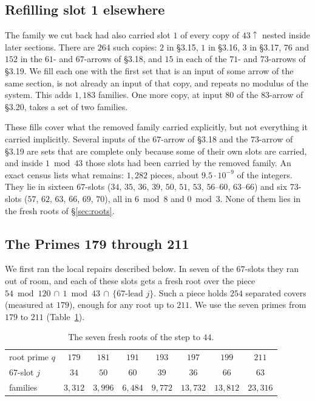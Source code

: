 \documentclass[11pt]{amsart}
\theoremstyle{definition}
\theoremstyle{remark}
\newcommand{\up}{{\uparrow}}
\begin{document}
\subsection*{Refilling slot 1 elsewhere}
The family we cut back had also carried slot $1$ of every copy of $43\up$ nested inside later sections. There are
$264$ such copies: $2$ in §3.15, $1$ in §3.16, $3$ in §3.17, $76$ and $152$ in the $61$- and $67$-arrows of §3.18,
and $15$ in each of the $71$- and $73$-arrows of §3.19. We fill each one with the first set that is an input of some
arrow of the same section, is not already an input of that copy, and repeats no modulus of the system. This adds
$1{,}183$ families. One more copy, at input $80$ of the $83$-arrow of §3.20, takes a set of two families.

These fills cover what the removed family carried explicitly, but not everything it carried implicitly. Several
inputs of the $67$-arrow of §3.18 and the $73$-arrow of §3.19 are sets that are complete only because some of their
own slots are carried, and inside $1 \bmod 43$ those slots had been carried by the removed family. An exact census
lists what remains: $1{,}282$ pieces, about $9.5\cdot10^{-9}$ of the integers. They lie in sixteen $67$-slots ($34$,
$35$, $36$, $39$, $50$, $51$, $53$, $56$--$60$, $63$--$66$) and six $73$-slots ($57$, $62$, $63$, $66$, $69$,
$70$), all in $6 \bmod 8$ and $0 \bmod 3$. None of them lies in the fresh roots of §\ref{sec:roots}.

\subsection*{The Primes 179 through 211}
We first ran the local repairs described below. In seven of the $67$-slots they ran out of
room, and each of these slots gets a fresh root over the piece
$54 \bmod 120\,\cap\,1 \bmod 43\,\cap\,\{\text{$67$-lead } j\}$. Such a piece holds $254$ separated covers (measured
at $179$), enough for any root up to $211$. We use the seven primes from $179$ to $211$
(Table~\ref{tab:roots44}).

\begin{table}[ht]
\centering
\caption{The seven fresh roots of the step to $44$.}\label{tab:roots44}
\begin{tabular}{@{}lccccccc@{}}
\toprule
root prime $q$ & $179$ & $181$ & $191$ & $193$ & $197$ & $199$ & $211$\\
$67$-slot $j$ & $34$ & $50$ & $60$ & $39$ & $36$ & $66$ & $63$\\
families & $3{,}312$ & $3{,}996$ & $6{,}484$ & $9{,}772$ & $13{,}732$ & $13{,}812$ & $23{,}316$\\
\bottomrule
\end{tabular}
\end{table}
\end{document}
